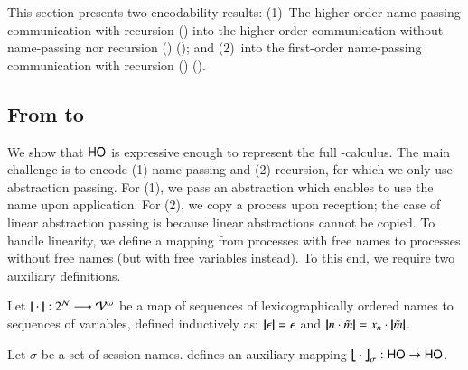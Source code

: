 \noi This section presents two encodability results:
(1)~The higher-order name-passing communication with recursion (\HOp) into 
the higher-order communication without name-passing nor 
recursion (\HO) (); and 
(2)~\HOp into the first-order name-passing communication
with recursion (\sessp) (). 

\subsection{From \HOp to \HO}
\label{subsec:HOpi_to_HO}
\noi We show that $\mathsf{HO}$ is expressive enough to
represent the full
 \HOp-calculus.
The main challenge is to encode (1) name passing 
and (2) recursion, 
for which 
we only use  abstraction passing. For (1), we pass  
an %
abstraction which enables to use the name upon application. 
For (2), we 
copy a process upon reception; the case of linear abstraction passing
is  
because 
linear abstractions cannot be copied.
To handle linearity, we define 
a mapping from processes with free names to processes without free
names (but with free variables instead).
To this end, we require two auxiliary definitions.

\smallskip 

\begin{definition}\rm 
\label{def:hop_to_ho}
	Let $|\!|\cdot|\!|: 2^{\mathcal{N}} \longrightarrow \mathcal{V}^\omega$
	be a map of sequences of 
lexicographically ordered names to sequences of variables, defined
	inductively as: 
	$|\!|\epsilon|\!| = \epsilon$ and $|\!|n \cdot \tilde{m}|\!| = x_n \cdot |\!|\tilde{m}|\!|$. 
\end{definition}

\smallskip 

%

\begin{definition} \label{d:trabs}\label{d:auxmap}
	Let $\sigma$ be a set of session names.
	 defines an auxiliary mapping
	$\big\lfloor\!\!\big\lfloor\cdot\big\rfloor\!\!\big\rfloor^{}_\sigma: \mathsf{HO} \to \mathsf{HO}$.
\end{definition}

